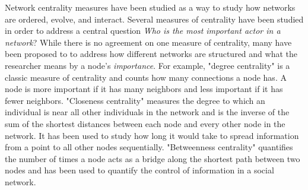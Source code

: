 \documentclass{article}
\theoremstyle{definition}
\theoremstyle{remark}
\begin{document}
Network centrality measures have been studied as a way to study how networks are ordered, evolve, and interact.  Several measures of centrality have been studied in order to address a central question \textit{Who is the most important actor in a network}?  While there is no agreement on one measure of centrality, many have been proposed to to address how different networks are structured and what the researcher means by a node's \textit{importance}.  For example, "degree centrality" is a classic measure of centrality and counts how many connections a node has.  A node is more important if it has many neighbors and less important if it has fewer neighbors.  "Closeness centrality" measures the degree to which an individual is near all other individuals in the network and is the inverse of the sum of the shortest distances between each node and every other node in the network.  It has been used to study how long it would take to spread information from a point to all other nodes sequentially.  "Betweenness centrality" quantifies the number of times a node acts as a bridge along the shortest path between two nodes and has been used to quantify the control of information in a social network. \\
\end{document}
